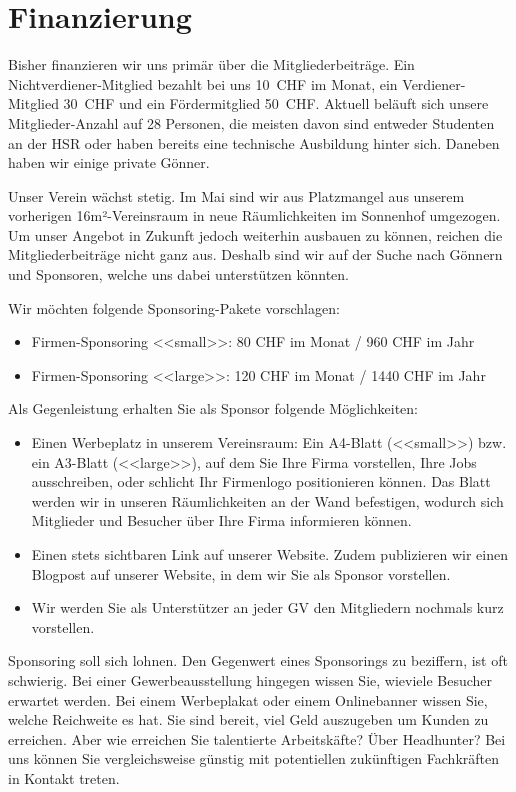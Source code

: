 \documentclass[10pt,a4paper,parskip,fleqn]{scrartcl}
\newcommand{\membercount}{28}
\begin{document}
\section{Finanzierung}

Bisher finanzieren wir uns primär über die Mitgliederbeiträge. Ein
Nichtverdiener-Mitglied bezahlt bei uns 10~CHF im Monat, ein Verdiener-Mitglied
30~CHF und ein Fördermitglied 50~CHF. Aktuell beläuft sich unsere
Mitglieder-Anzahl auf \membercount{} Personen, die meisten davon sind entweder
Studenten an der HSR oder haben bereits eine technische Ausbildung hinter sich.
Daneben haben wir einige private Gönner.

Unser Verein wächst stetig. Im Mai sind wir aus Platzmangel aus unserem
vorherigen 16m²-Vereinsraum in neue Räumlichkeiten im Sonnenhof umgezogen. Um
unser Angebot in Zukunft jedoch weiterhin ausbauen zu können, reichen die
Mitgliederbeiträge nicht ganz aus. Deshalb sind wir auf der Suche nach Gönnern
und Sponsoren, welche uns dabei unterstützen könnten.

Wir möchten folgende Sponsoring-Pakete vorschlagen:

\begin{itemize}
	\item Firmen-Sponsoring <<small>>: 80 CHF im Monat / 960 CHF im Jahr	
	\item Firmen-Sponsoring <<large>>: 120 CHF im Monat / 1440 CHF im Jahr	
\end{itemize}

Als Gegenleistung erhalten Sie als Sponsor folgende Möglichkeiten:

\begin{itemize}
	\item Einen Werbeplatz in unserem Vereinsraum: Ein A4-Blatt (<<small>>) bzw.
		ein A3-Blatt (<<large>>), auf dem Sie Ihre Firma vorstellen, Ihre Jobs
		ausschreiben, oder schlicht Ihr Firmenlogo positionieren können. Das Blatt
		werden wir in unseren Räumlichkeiten an der Wand befestigen, wodurch sich
		Mitglieder und Besucher über Ihre Firma informieren können.
	\item Einen stets sichtbaren Link auf unserer Website. Zudem publizieren wir
		einen Blogpost auf unserer Website, in dem wir Sie als Sponsor vorstellen.
	\item Wir werden Sie als Unterstützer an jeder GV den Mitgliedern nochmals
		kurz vorstellen.
\end{itemize}

Sponsoring soll sich lohnen. Den Gegenwert eines Sponsorings zu beziffern, ist
oft schwierig. Bei einer Gewerbeausstellung hingegen wissen Sie, wieviele
Besucher erwartet werden. Bei einem Werbeplakat oder einem Onlinebanner wissen
Sie, welche Reichweite es hat. Sie sind bereit, viel Geld auszugeben um Kunden
zu erreichen. Aber wie erreichen Sie talentierte Arbeitskäfte? Über Headhunter?
Bei uns können Sie vergleichsweise günstig mit potentiellen zukünftigen
Fachkräften in Kontakt treten.
\end{document}
